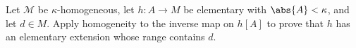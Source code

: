\begin{exercise}
\label{ex:types-ultraproducts-02}
\label{ex:homogeneity-back-step}
Let \(\mathcal M\) be \(\kappa\)-homogeneous, let \(h:A\to M\) be elementary
with \(\abs{A}<\kappa\), and let \(d\in M\).  Apply homogeneity to the inverse
map on \(h[A]\) to prove that \(h\) has an elementary extension whose range
contains \(d\).
\end{exercise}

